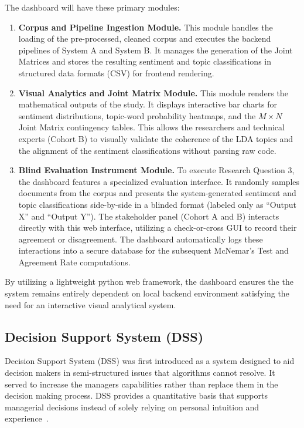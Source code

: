 \documentclass[12pt,a4paper]{report}
\begin{document}
The dashboard will have these primary modules:
\begin{enumerate}
	\item \textbf{Corpus and Pipeline Ingestion Module.} This module handles 
	the loading of the pre-processed, cleaned corpus and executes the backend 
	pipelines of System A and System B. It manages the generation of the 
	Joint Matrices and stores the resulting sentiment and topic classifications 
	in structured data formats (CSV) for frontend rendering.
	
	\item \textbf{Visual Analytics and Joint Matrix Module.} This module 
	renders the mathematical outputs of the study. It displays interactive 
	bar charts for sentiment distributions, topic-word probability heatmaps, 
	and the $M \times N$ Joint Matrix contingency tables. This allows the 
	researchers and technical experts (Cohort B) to visually validate the 
	coherence of the LDA topics and the alignment of the sentiment 
	classifications without parsing raw code.
	
	\item \textbf{Blind Evaluation Instrument Module.} To execute Research 
	Question 3, the dashboard features a specialized evaluation interface. 
	It randomly samples documents from the corpus and presents the 
	system-generated sentiment and topic classifications side-by-side in a 
	blinded format (labeled only as ``Output X'' and ``Output Y''). The 
	stakeholder panel (Cohort A and B) interacts directly with this web 
	interface, utilizing a check-or-cross GUI to record their agreement or 
	disagreement. The dashboard automatically logs these interactions into 
	a secure database for the subsequent McNemar's Test and Agreement Rate 
	computations.
\end{enumerate}

By utilizing a lightweight python web framework, the dashboard ensures the the system remains entirely dependent on local backend environment satisfying the need for
an interactive visual analytical system.

\subsection{Decision Support System (DSS)}

Decision Support System (DSS) was first introduced as a system designed to aid decision makers in semi-structured issues that algorithms cannot resolve. It served to increase the managers capabilities rather than replace them in the decision making process. DSS provides a quantitative basis that supports managerial decisions instead of solely relying on personal intuition and experience~\cite{Rashidi2018}.
\end{document}
